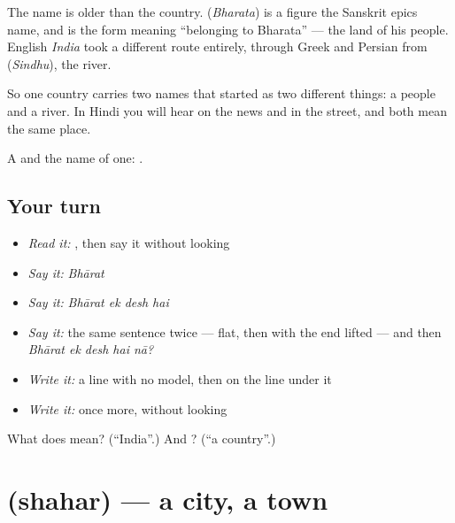 The name is older than the country.  (\emph{Bharata}) is a figure the Sanskrit epics name, and  is the form meaning \textquotedblleft{}belonging to Bharata\textquotedblright{} — the land of his people. English \emph{India} took a different route entirely, through Greek and Persian from  (\emph{Sindhu}), the river.

So one country carries two names that started as two different things: a people and a river. In Hindi you will hear  on the news and  in the street, and both mean the same place.

\begin{grammarlens}[title={What you've built}]
A  and the name of one:    .
\end{grammarlens}

\subsection*{Your turn}
\begin{itemize}
\raggedright
  \item \emph{Read it:} \textbf{}, then say it without looking
  \item \emph{Say it:} \emph{Bhārat}
  \item \emph{Say it:} \emph{Bhārat ek desh hai}
  \item \emph{Say it:} the same sentence twice — flat, then with the end lifted — and then \emph{Bhārat ek desh hai nā?}
  \item \emph{Write it:} a  line with no model, then  on the line under it
  \item \emph{Write it:}  once more, without looking
\end{itemize}

\begin{tcolorbox}[breakable,colback=teal!4,colframe=teal!35!black,title={Before you move on}]
What does  mean? (\textquotedblleft{}India\textquotedblright{}.) And ? (\textquotedblleft{}a country\textquotedblright{}.)
\end{tcolorbox}
\section[\texorpdfstring{\hi{शहर} (shahar)}{शहर (shahar)}]{ (shahar) — a city, a town}

\label{lesson:HI-C68-city}




